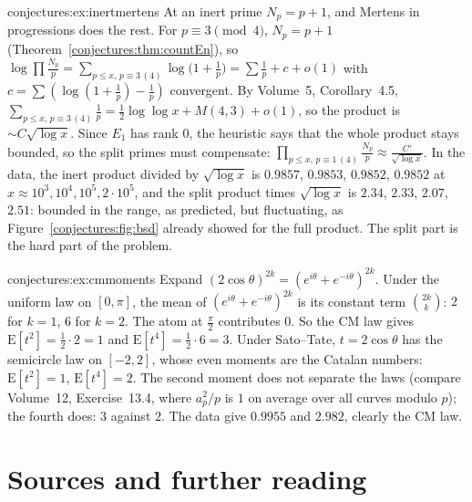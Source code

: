 \begin{solution}{conjectures:ex:inertmertens}
\idea At an inert prime $N_p=p+1$, and Mertens in progressions does the rest.
\writeup For $p\equiv3\pmod4$, $N_p=p+1$ (Theorem~\ref{conjectures:thm:countEn}), so $\log\prod\frac{N_p}p=\sum_{p\le x,\,p\equiv3\,(4)}\log\bigl(1+\frac1p\bigr)
=\sum\frac1p+c+o(1)$ with $c=\sum(\log(1+\frac1p)-\frac1p)$ convergent. By Volume~5, Corollary~4.5, $\sum_{p\le x,\,p\equiv3\,(4)}\frac1p=\frac12\log\log x+M(4,3)+o(1)$,
so the product is $\sim C\sqrt{\log x}$. Since $E_1$ has rank $0$, the heuristic says that the whole product stays bounded, so the split primes must
compensate: $\prod_{p\le x,\,p\equiv1\,(4)}\frac{N_p}p\approx\frac{C'}{\sqrt{\log x}}$. In the data, the inert product divided by $\sqrt{\log x}$ is $0.9857$,
$0.9853$, $0.9852$, $0.9852$ at $x\approx10^3,10^4,10^5,2\cdot10^5$, and the split product times $\sqrt{\log x}$ is $2.34$, $2.33$, $2.07$, $2.51$: bounded
in the range, as predicted, but fluctuating, as Figure~\ref{conjectures:fig:bsd} already showed for the full product. The split part is the hard part of the problem.
\end{solution}

\begin{solution}{conjectures:ex:cmmoments}
\idea Expand $(2\cos\theta)^{2k}=(e^{i\theta}+e^{-i\theta})^{2k}$.
\writeup Under the uniform law on $[0,\pi]$, the mean of $(e^{i\theta}+e^{-i\theta})^{2k}$ is its constant term $\binom{2k}k$: $2$ for $k=1$, $6$ for $k=2$. The
atom at $\frac\pi2$ contributes $0$. So the CM law gives $\mathrm E[t^2]=\frac12\cdot2=1$ and $\mathrm E[t^4]=\frac12\cdot6=3$. Under Sato--Tate, $t=2\cos\theta$ has
the semicircle law on $[-2,2]$, whose even moments are the Catalan numbers: $\mathrm E[t^2]=1$, $\mathrm E[t^4]=2$. The second moment does not separate the
laws (compare Volume~12, Exercise~13.4, where $a_p^2/p$ is $1$ on average over all curves modulo $p$); the fourth does: $3$ against $2$. The data give $0.9955$ and $2.982$, clearly the CM law.
\end{solution}

\section*{Sources and further reading}

